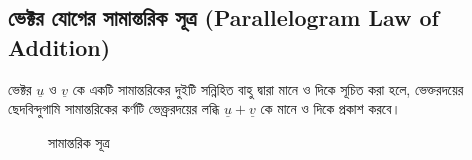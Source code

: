 \subsection*{ভেক্টর যোগের সামান্তরিক সূত্র (Parallelogram Law of Addition)}
\begin{tcolorbox}[colback=green!5!white,colframe=green!75!black,title=সামান্তরিক সূত্র]
	ভেক্টর $\underline{u}$ ও $\underline{v}$ কে একটি সামান্তরিকের দুইটি সন্নিহিত বাহু দ্বারা মানে ও দিকে সূচিত করা হলে, ভেক্তরদয়ের ছেদবিন্দুগামি সামান্তরিকের কর্ণটি ভেক্ত্ররদয়ের লব্ধি $\underline{u}+\underline{v}$ কে মানে ও দিকে প্রকাশ করবে।
\end{tcolorbox}
\begin{figure}[h]
	\centering
	
	\caption{সামান্তরিক সূত্র}
	\label{vec-fig-8}
\end{figure} 

